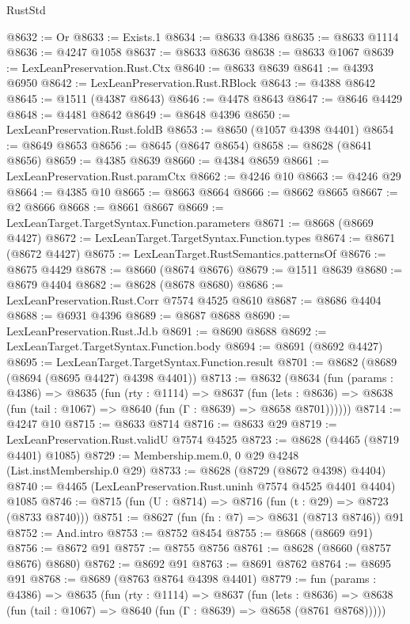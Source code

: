 \begin{lexlean}{RustStd}
\begin{coremodule}
@8632 := Or
@8633 := Exists.{1}
@8634 := @8633 @4386
@8635 := @8633 @1114
@8636 := @4247 @1058
@8637 := @8633 @8636
@8638 := @8633 @1067
@8639 := LexLeanPreservation.Rust.Ctx
@8640 := @8633 @8639
@8641 := @4393 @6950
@8642 := LexLeanPreservation.Rust.RBlock
@8643 := @4388 @8642
@8645 := @1511 (@4387 @8643)
@8646 := @4478 @8643
@8647 := @8646 @4429
@8648 := @4481 @8642
@8649 := @8648 @4396
@8650 := LexLeanPreservation.Rust.foldB
@8653 := @8650 (@1057 @4398 @4401)
@8654 := @8649 @8653
@8656 := @8645 (@8647 @8654)
@8658 := @8628 (@8641 @8656)
@8659 := @4385 @8639
@8660 := @4384 @8659
@8661 := LexLeanPreservation.Rust.paramCtx
@8662 := @4246 @10
@8663 := @4246 @29
@8664 := @4385 @10
@8665 := @8663 @8664
@8666 := @8662 @8665
@8667 := @2 @8666
@8668 := @8661 @8667
@8669 := LexLeanTarget.TargetSyntax.Function.parameters
@8671 := @8668 (@8669 @4427)
@8672 := LexLeanTarget.TargetSyntax.Function.types
@8674 := @8671 (@8672 @4427)
@8675 := LexLeanTarget.RustSemantics.patternsOf
@8676 := @8675 @4429
@8678 := @8660 (@8674 @8676)
@8679 := @1511 @8639
@8680 := @8679 @4404
@8682 := @8628 (@8678 @8680)
@8686 := LexLeanPreservation.Rust.Corr @7574 @4525 @8610
@8687 := @8686 @4404
@8688 := @6931 @4396
@8689 := @8687 @8688
@8690 := LexLeanPreservation.Rust.Jd.b
@8691 := @8690 @8688
@8692 := LexLeanTarget.TargetSyntax.Function.body
@8694 := @8691 (@8692 @4427)
@8695 := LexLeanTarget.TargetSyntax.Function.result
@8701 := @8682 (@8689 (@8694 (@8695 @4427) @4398 @4401))
@8713 := @8632
    (@8634
      (fun (params : @4386) =>
      @8635
        (fun (rty : @1114) =>
        @8637
          (fun (lets : @8636) =>
          @8638 (fun (tail : @1067) => @8640 (fun (Γ : @8639) => @8658 @8701))))))
@8714 := @4247 @10
@8715 := @8633 @8714
@8716 := @8633 @29
@8719 := LexLeanPreservation.Rust.validU @7574 @4525
@8723 := @8628 (@4465 (@8719 @4401) @1085)
@8729 := Membership.mem.{0, 0} @29 @4248 (List.instMembership.{0} @29)
@8733 := @8628 (@8729 (@8672 @4398) @4404)
@8740 := @4465 (LexLeanPreservation.Rust.uninh @7574 @4525 @4401 @4404) @1085
@8746 := @8715 (fun (U : @8714) => @8716 (fun (t : @29) => @8723 (@8733 @8740)))
@8751 := @8627 (fun (fn : @7) => @8631 (@8713 @8746)) @91
@8752 := And.intro
@8753 := @8752 @8454
@8755 := @8668 (@8669 @91)
@8756 := @8672 @91
@8757 := @8755 @8756
@8761 := @8628 (@8660 (@8757 @8676) @8680)
@8762 := @8692 @91
@8763 := @8691 @8762
@8764 := @8695 @91
@8768 := @8689 (@8763 @8764 @4398 @4401)
@8779 := fun (params : @4386) =>
  @8635
    (fun (rty : @1114) =>
    @8637
      (fun (lets : @8636) =>
      @8638 (fun (tail : @1067) => @8640 (fun (Γ : @8639) => @8658 (@8761 @8768)))))

\end{coremodule}
\end{lexlean}
